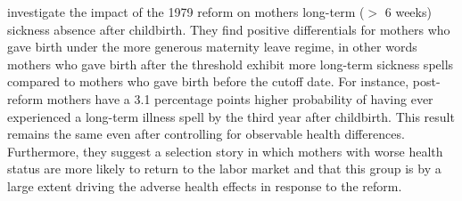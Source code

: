 \documentclass[11pt, a4paper,draft]{article} %
\begin{document}

\cite{guertzgen2018} investigate the impact of the 1979 reform on mothers long-term ($>$ 6 weeks) sickness absence after childbirth. They find positive differentials for mothers who gave birth under the more generous maternity leave regime, in other words mothers who gave birth after the threshold exhibit more long-term sickness spells compared to mothers who gave birth before the cutoff date. For instance, post-reform mothers have a 3.1 percentage points higher probability of having ever experienced a long-term illness spell by the third year after childbirth. This result remains the same even after controlling for observable health differences. Furthermore, they suggest a selection story in which mothers with worse health status are more likely to return to the labor market and that this group is by a large extent driving the adverse health effects in response to the reform.\newline
\end{document}
